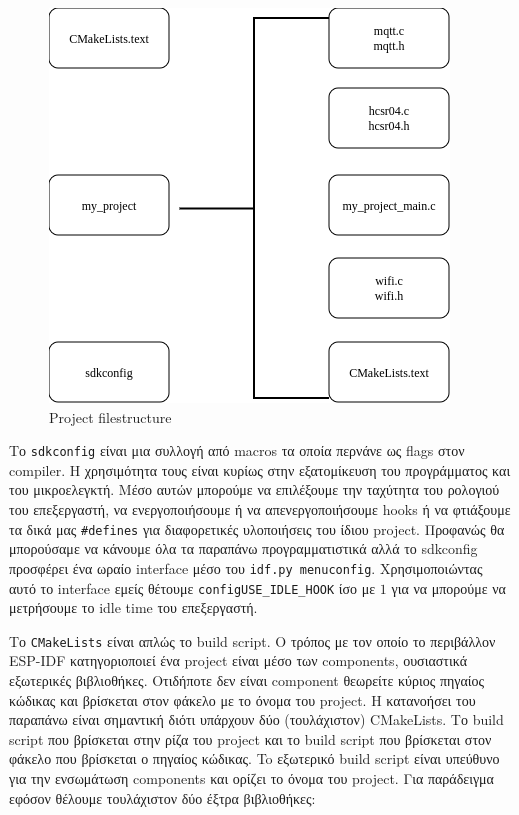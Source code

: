 \begin{figure}[!htb]
    \centering
    \includegraphics[scale=0.4]{images/espidf/idf-filestructure.png}
    \caption{Project filestructure}
    \label{fig:idf_filestructure}
\end{figure}

Το \verb|sdkconfig| είναι μια συλλογή από macros τα
οποία περνάνε ως flags στον compiler. Η χρησιμότητα τους
είναι κυρίως στην εξατομίκευση του προγράμματος και του
μικροελεγκτή. Μέσο αυτών μπορούμε να επιλέξουμε την ταχύτητα του
ρολογιού του επεξεργαστή, να ενεργοποιήσουμε ή να απενεργοποιήσουμε
hooks ή να φτιάξουμε τα δικά μας \verb|#defines| για διαφορετικές υλοποιήσεις
του ίδιου project. Προφανώς θα μπορούσαμε να κάνουμε όλα τα παραπάνω
προγραμματιστικά αλλά το sdkconfig προσφέρει ένα ωραίο interface μέσο
του \verb|idf.py menuconfig|. Χρησιμοποιώντας αυτό το interface εμείς
θέτουμε \verb|configUSE_IDLE_HOOK| ίσο με $1$ για να μπορούμε
να μετρήσουμε το idle time του επεξεργαστή.

Το \verb|CMakeLists| είναι απλώς το build script. Ο τρόπος με τον
οποίο το περιβάλλον ESP-IDF κατηγοριοποιεί ένα project είναι μέσο των
components, ουσιαστικά εξωτερικές βιβλιοθήκες. Οτιδήποτε δεν είναι
component θεωρείτε κύριος πηγαίος κώδικας και βρίσκεται στον φάκελο με
το όνομα του project. Η κατανοήσει του παραπάνω είναι σημαντική διότι
υπάρχουν δύο (τουλάχιστον) CMakeLists. Το build script που βρίσκεται
στην ρίζα του project και το build script που βρίσκεται στον φάκελο
που βρίσκεται ο πηγαίος κώδικας. To εξωτερικό build script είναι
υπεύθυνο για την ενσωμάτωση components και ορίζει το όνομα του project.
Για παράδειγμα εφόσον θέλουμε τουλάχιστον δύο έξτρα βιβλιοθήκες:

